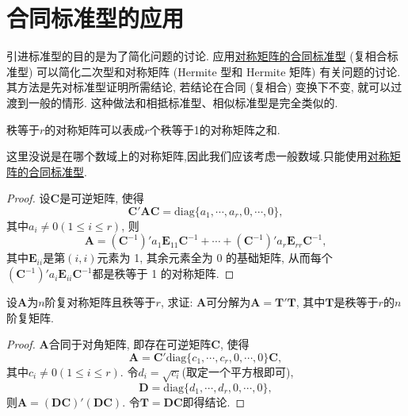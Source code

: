 \documentclass[../../main.tex]{subfiles}
\begin{document}
\section{合同标准型的应用}

引进标准型的目的是为了简化问题的讨论. 应用\hyperref[theorem:对称矩阵的合同标准型]{对称矩阵的合同标准型} (复相合标准型) 可以简化二次型和对称矩阵 (Hermite 型和 Hermite 矩阵) 有关问题的讨论. 其方法是先对标准型证明所需结论, 若结论在合同 (复相合) 变换下不变, 就可以过渡到一般的情形. 这种做法和相抵标准型、相似标准型是完全类似的.

\begin{proposition}[对称矩阵的秩1分解]\label{proposition:对称矩阵的秩1分解}
秩等于$r$的对称矩阵可以表成$r$个秩等于1的对称矩阵之和.
\end{proposition}
\begin{remark}
这里没说是在哪个数域上的对称矩阵,因此我们应该考虑一般数域.只能使用\hyperref[theorem:对称矩阵的合同标准型]{对称矩阵的合同标准型}.
\end{remark}
\begin{proof}
设$\boldsymbol{C}$是可逆矩阵, 使得
\[
\boldsymbol{C}'\boldsymbol{A}\boldsymbol{C}=\text{diag}\{a_1, \cdots, a_r, 0, \cdots, 0\},
\]
其中$a_i\neq 0 (1\leqslant  i\leqslant  r)$, 则
\[
\boldsymbol{A}=(\boldsymbol{C}^{-1})'a_1\boldsymbol{E}_{11}\boldsymbol{C}^{-1}+\cdots+(\boldsymbol{C}^{-1})'a_r\boldsymbol{E}_{rr}\boldsymbol{C}^{-1},
\]
其中$\boldsymbol{E}_{ii}$是第$(i, i)$元素为 1, 其余元素全为 0 的基础矩阵, 从而每个$(\boldsymbol{C}^{-1})'a_i\boldsymbol{E}_{ii}\boldsymbol{C}^{-1}$都是秩等于 1 的对称矩阵. 

\end{proof}

\begin{proposition}\label{proposition:复对称阵都可分解成相同秩的复矩阵与其转置的乘积}
设$\boldsymbol{A}$为$n$阶复对称矩阵且秩等于$r$, 求证: $\boldsymbol{A}$可分解为$\boldsymbol{A}=\boldsymbol{T}'\boldsymbol{T}$, 其中$\boldsymbol{T}$是秩等于$r$的$n$阶复矩阵.
\end{proposition}
\begin{proof}
$\boldsymbol{A}$合同于对角矩阵, 即存在可逆矩阵$\boldsymbol{C}$, 使得
\[
\boldsymbol{A}=\boldsymbol{C}'\text{diag}\{c_1, \cdots, c_r, 0, \cdots, 0\}\boldsymbol{C},
\]
其中$c_i\neq 0 (1\leqslant  i\leqslant  r)$. 令$d_i = \sqrt{c_i}$(取定一个平方根即可),
\[
\boldsymbol{D}=\text{diag}\{d_1, \cdots, d_r, 0, \cdots, 0\},
\]
则$\boldsymbol{A}=(\boldsymbol{D}\boldsymbol{C})'(\boldsymbol{D}\boldsymbol{C})$. 令$\boldsymbol{T}=\boldsymbol{D}\boldsymbol{C}$即得结论. 

\end{proof}
\end{document}
